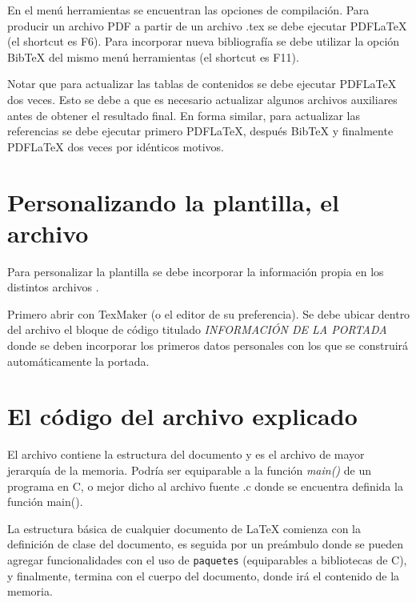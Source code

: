 En el menú herramientas se encuentran las opciones de compilación.  Para producir un archivo PDF a partir de un archivo .tex se debe ejecutar PDFLaTeX (el shortcut es F6). Para incorporar nueva bibliografía se debe utilizar la opción BibTeX del mismo menú herramientas (el shortcut es F11).

Notar que para actualizar las tablas de contenidos se debe ejecutar PDFLaTeX dos veces.  Esto se debe a que es necesario actualizar algunos archivos auxiliares antes de obtener el resultado final.  En forma similar, para actualizar las referencias se debe ejecutar primero PDFLaTeX, después BibTeX y finalmente PDFLaTeX dos veces por idénticos motivos.

\section{Personalizando la plantilla, el archivo }
\label{sec:FillingFile}

Para personalizar la plantilla se debe incorporar la información propia en los distintos archivos . 

Primero abrir  con TexMaker (o el editor de su preferencia). Se debe ubicar dentro del archivo el bloque de código titulado \emph{INFORMACIÓN DE LA PORTADA} donde se deben incorporar los primeros datos personales con los que se construirá automáticamente la portada.



\section{El código del archivo  explicado}

El archivo  contiene la estructura del documento y es el archivo de mayor jerarquía de la memoria.  Podría ser equiparable a la función \emph{main()} de un programa en C, o mejor dicho al archivo fuente .c donde se encuentra definida la función main().

La estructura básica de cualquier documento de \LaTeX{} comienza con la definición de clase del documento, es seguida por un preámbulo donde se pueden agregar funcionalidades con el uso de \texttt{paquetes} (equiparables a bibliotecas de C), y finalmente, termina con el cuerpo del documento, donde irá el contenido de la memoria.


